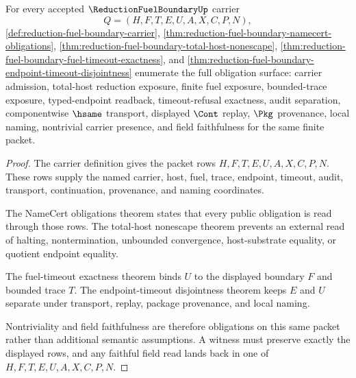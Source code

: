 \begin{theorem}
\label{thm:reduction-fuel-boundary-obligation-closure-package}
For every accepted $\ReductionFuelBoundaryUp$ carrier
$$
Q=(H,F,T,E,U,A,X,C,P,N),
$$
\autoref{def:reduction-fuel-boundary-carrier}, \autoref{thm:reduction-fuel-boundary-namecert-obligations}, \autoref{thm:reduction-fuel-boundary-total-host-nonescape}, \autoref{thm:reduction-fuel-boundary-fuel-timeout-exactness}, and \autoref{thm:reduction-fuel-boundary-endpoint-timeout-disjointness} enumerate the full obligation surface: carrier admission, total-host reduction exposure, finite fuel exposure, bounded-trace exposure, typed-endpoint readback, timeout-refusal exactness, audit separation, componentwise $\hsame$ transport, displayed $\Cont$ replay, $\Pkg$ provenance, local naming, nontrivial carrier presence, and field faithfulness for the same finite packet.
\end{theorem}
\begin{proof}
The carrier definition gives the packet rows $H,F,T,E,U,A,X,C,P,N$. These rows supply the named carrier, host, fuel, trace, endpoint, timeout, audit, transport, continuation, provenance, and naming coordinates.

The NameCert obligations theorem states that every public obligation is read through those rows. The total-host nonescape theorem prevents an external read of halting, nontermination, unbounded convergence, host-substrate equality, or quotient endpoint equality.

The fuel-timeout exactness theorem binds $U$ to the displayed boundary $F$ and bounded trace $T$. The endpoint-timeout disjointness theorem keeps $E$ and $U$ separate under transport, replay, package provenance, and local naming.

Nontriviality and field faithfulness are therefore obligations on this same packet rather than additional semantic assumptions. A witness must preserve exactly the displayed rows, and any faithful field read lands back in one of $H,F,T,E,U,A,X,C,P,N$.
\end{proof}

